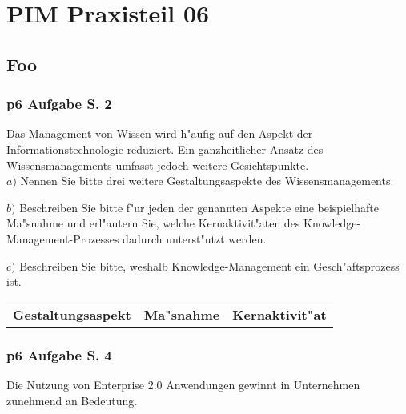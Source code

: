 
\chapter{PIM Praxisteil 06}

\section{Foo}

\subsection{p6 Aufgabe S. 2}

Das Management von Wissen wird h"aufig auf den Aspekt der Informationstechnologie reduziert.
Ein ganzheitlicher Ansatz des Wissensmanagements umfasst jedoch weitere Gesichtspunkte.\\

\noindent
$a)$ Nennen Sie bitte drei weitere Gestaltungsaspekte des Wissensmanagements.\\

\begin{quote}
\end{quote}

\noindent
$b)$ Beschreiben Sie bitte f"ur jeden der genannten Aspekte eine beispielhafte Ma"snahme und erl"autern Sie, welche Kernaktivit"aten des Knowledge-Management-Prozesses dadurch unterst"utzt werden.

\begin{quote}
\end{quote}

\noindent
$c)$ Beschreiben Sie bitte, weshalb Knowledge-Management ein Gesch"aftsprozess ist.

\begin{tabular}{ l l l } %
    \hline
    \rowcolor{LightSlateGrey}
    \textbf{Gestaltungsaspekt} & \textbf{Ma"snahme} & \textbf{Kernaktivit"at}
\end{tabular}
\begin{quote}
\end{quote}

\subsection{p6 Aufgabe S. 4}
Die Nutzung von Enterprise 2.0 Anwendungen gewinnt in Unternehmen zunehmend an Bedeutung.\\
\begin{quote}
\end{quote}

